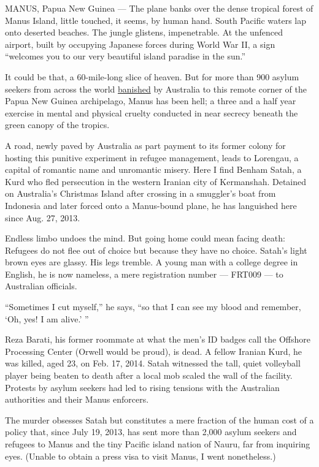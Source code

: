 MANUS, Papua New Guinea --- The plane banks over the dense tropical
forest of Manus Island, little touched, it seems, by human hand. South
Pacific waters lap onto deserted beaches. The jungle glistens,
impenetrable. At the unfenced airport, built by occupying Japanese
forces during World War II, a sign ``welcomes you to our very beautiful
island paradise in the sun.''

It could be that, a 60-mile-long slice of heaven. But for more than 900
asylum seekers from across the world
\href{http://www.nytimes.com/2016/05/24/opinion/australias-offshore-cruelty.html}{banished}
by Australia to this remote corner of the Papua New Guinea archipelago,
Manus has been hell; a three and a half year exercise in mental and
physical cruelty conducted in near secrecy beneath the green canopy of
the tropics.

A road, newly paved by Australia as part payment to its former colony
for hosting this punitive experiment in refugee management, leads to
Lorengau, a capital of romantic name and unromantic misery. Here I find
Benham Satah, a Kurd who fled persecution in the western Iranian city of
Kermanshah. Detained on Australia's Christmas Island after crossing in a
smuggler's boat from Indonesia and later forced onto a Manus-bound
plane, he has languished here since Aug. 27, 2013.

Endless limbo undoes the mind. But going home could mean facing death:
Refugees do not flee out of choice but because they have no choice.
Satah's light brown eyes are glassy. His legs tremble. A young man with
a college degree in English, he is now nameless, a mere registration
number --- FRT009 --- to Australian officials.

``Sometimes I cut myself,'' he says, ``so that I can see my blood and
remember, `Oh, yes! I am alive.' ''

Reza Barati, his former roommate at what the men's ID badges call the
Offshore Processing Center (Orwell would be proud), is dead. A fellow
Iranian Kurd, he was killed, aged 23, on Feb. 17, 2014. Satah witnessed
the tall, quiet volleyball player being beaten to death after a local
mob scaled the wall of the facility. Protests by asylum seekers had led
to rising tensions with the Australian authorities and their Manus
enforcers.

The murder obsesses Satah but constitutes a mere fraction of the human
cost of a policy that, since July 19, 2013, has sent more than 2,000
asylum seekers and refugees to Manus and the tiny Pacific island nation
of Nauru, far from inquiring eyes. (Unable to obtain a press visa to
visit Manus, I went nonetheless.)

